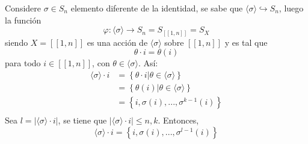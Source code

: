 \documentclass[12pt]{report}
\theoremstyle{largebreak}
\newcommand\abs[1]{\ensuremath{\left|#1\right|}}
\newcommand\cf[3]{\ensuremath{#1:#2\rightarrow#3}}
\newcommand\natint[1]{\ensuremath{\left[\!\left[ #1\right]\!\right]}}
\begin{document}
    \begin{obs}
        Considere $\sigma\in S_n$ elemento diferente de la identidad, se sabe que $\langle\sigma\rangle\hookrightarrow S_n$, luego la función
        \begin{equation*}
            \cf{\varphi}{\langle\sigma\rangle}{S_n=S_{\natint{1,n}}=S_X}
        \end{equation*}
        siendo $X=\natint{1,n}$ es una acción de $\langle\sigma\rangle$ sobre $\natint{1,n}$ y es tal que
        \begin{equation*}
            \theta\cdot i=\theta(i)
        \end{equation*}
        para todo $i\in\natint{1,n}$, con $\theta\in\langle\sigma\rangle$. Así:
        \begin{equation*}
            \begin{split}
                \langle\sigma\rangle\cdot i&=\left\{\theta\cdot i\Big|\theta\in\langle\sigma\rangle \right\}\\
                &=\left\{\theta(i)\Big|\theta\in\langle\sigma\rangle \right\}\\
                &=\left\{i,\sigma(i),...,\sigma^{k-1}(i)\right\}\\
            \end{split}
        \end{equation*}
        Sea $l=\abs{\langle\sigma\rangle\cdot i}$, se tiene que $\abs{\langle\sigma\rangle\cdot i}\leq n,k$. Entonces,
        \begin{equation*}
            \langle\sigma\rangle\cdot i=\left\{i,\sigma(i),...,\sigma^{ l-1}(i) \right\}
        \end{equation*}
    \end{obs}
\end{document}
